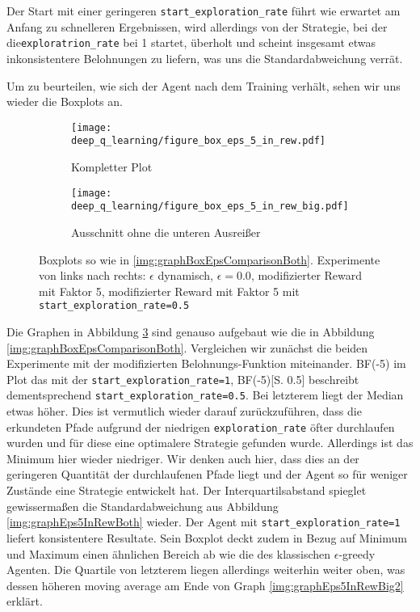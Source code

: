 Der Start mit einer geringeren \texttt{start_exploration_rate} führt wie erwartet am Anfang zu schnelleren Ergebnissen, wird allerdings von der Strategie, bei der die\linebreak\texttt{exploratrion_rate} bei 1 startet, überholt und scheint insgesamt etwas inkonsistentere Belohnungen zu liefern, was uns die Standardabweichung verrät.

Um zu beurteilen, wie sich der Agent nach dem Training verhält, sehen wir uns wieder die Boxplots an.

\begin{figure}[h!]
    \centering
    \begin{subfigure}[b]{0.7\textwidth}
        \texttt{[image: deep\_q\_learning/figure\_box\_eps\_5\_in\_rew.pdf]}
        \caption{Kompletter Plot}
        \label{img:graphBoxEps5InRew}
    \end{subfigure}
    \begin{subfigure}[b]{0.7\textwidth}
        \texttt{[image: deep\_q\_learning/figure\_box\_eps\_5\_in\_rew\_big.pdf]}
        \caption{Ausschnitt ohne die unteren Ausreißer}
        \label{img:graphBoxEps5InRewBig}
    \end{subfigure}
    \caption{Boxplots so wie in \ref{img:graphBoxEpsComparisonBoth}. Experimente von links nach rechts: $ \epsilon $ dynamisch, $ \epsilon = 0.0 $, modifizierter Reward mit Faktor 5, modifizierter Reward mit Faktor 5 mit \texttt{start_exploration_rate=0.5}}
    \label{img:graphBoxEps5InRewBoth}
\end{figure}

Die Graphen in Abbildung \ref{img:graphBoxEps5InRewBoth} sind genauso aufgebaut wie die in Abbildung \ref{img:graphBoxEpsComparisonBoth}. Vergleichen wir zunächst die beiden Experimente mit der modifizierten Belohnungs-Funktion miteinander. BF(-5) im Plot das mit der \texttt{start_exploration_rate=1}, BF(-5)[S. 0.5] beschreibt dementsprechend \texttt{start_exploration_rate=0.5}. Bei letzterem liegt der Median etwas höher. Dies ist vermutlich wieder darauf zurückzuführen, dass die erkundeten Pfade aufgrund der niedrigen \texttt{exploration_rate} öfter durchlaufen wurden und für diese eine optimalere Strategie gefunden wurde. Allerdings ist das Minimum hier wieder niedriger. Wir denken auch hier, dass dies an der geringeren Quantität der durchlaufenen Pfade liegt und der Agent so für weniger Zustände eine Strategie entwickelt hat. Der Interquartilsabstand spieglet gewissermaßen die Standardabweichung aus Abbildung \ref{img:graphEps5InRewBoth} wieder. Der Agent mit \texttt{start_exploration_rate=1} liefert konsistentere Resultate. Sein Boxplot deckt zudem in Bezug auf Minimum und Maximum einen ähnlichen Bereich ab wie die des klassischen $ \epsilon $-greedy Agenten. Die Quartile von letzterem liegen allerdings weiterhin weiter oben, was dessen höheren moving average am Ende von Graph \ref{img:graphEps5InRewBig2} erklärt.

